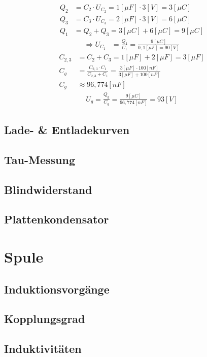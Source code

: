 \begin{align}
    Q_2&=C_2\cdot U_{C_2}=1[\mu F]\cdot 3[V]=3[\mu C] \\
    Q_3&=C_3\cdot U_{C_3}=2[\mu F]\cdot 3[V]=6[\mu C] \\
    Q_1&=Q_2+Q_3=3[\mu C]+6[\mu C]=9[\mu C]
\end{align}
\begin{align}
    \Rightarrow U_{C_1}&=\frac{Q_1}{C_1}=\frac{9[\mu C]}{0,1[\mu F]=90[V]}
\end{align}
\begin{align}
    C_{2,3}&=C_2+C_3=1[\mu F]+2[\mu F]=3[\mu F]\\
    C_g&=\frac{C_{2,3}\cdot C_1}{C_{2,3}+ C_1}=\frac{3[\mu F]\cdot 100[nF]}{3[\mu F]+ 100[nF]} \\
    C_g&\approx 96,774[nF]
\end{align}
\begin{align}
    U_g=\frac{Q_g}{C_g}=\frac{9[\mu C]}{96,774[nF]}=93[V]
\end{align}

\subsection{Lade- \& Entladekurven}
\subsection{Tau-Messung}
\subsection{Blindwiderstand}
\subsection{Plattenkondensator}

\section{Spule}

\subsection{Induktionsvorgänge}

\subsection{Kopplungsgrad}

\subsection{Induktivitäten}



